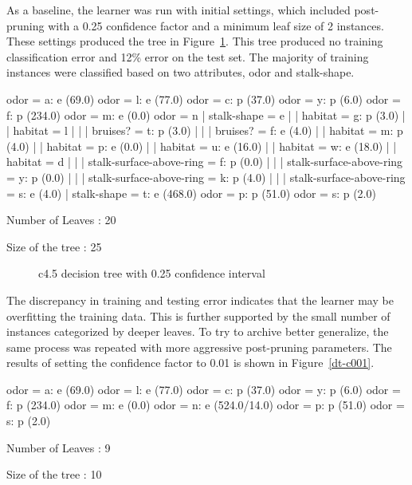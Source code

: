 \documentclass{sig-alternate}
\begin{document}
As a baseline, the learner was run with initial settings, which included post-pruning with a 0.25 confidence factor and a minimum leaf size of 2 instances. These settings produced the tree in Figure~\ref{dt-c025}. This tree produced no training classification error and 12\% error on the test set. The majority of training instances were classified based on two attributes, odor and stalk-shape.

\begin{verbbox}

odor = a: e (69.0)
odor = l: e (77.0)
odor = c: p (37.0)
odor = y: p (6.0)
odor = f: p (234.0)
odor = m: e (0.0)
odor = n
|   stalk-shape = e
|   |   habitat = g: p (3.0)
|   |   habitat = l
|   |   |   bruises? = t: p (3.0)
|   |   |   bruises? = f: e (4.0)
|   |   habitat = m: p (4.0)
|   |   habitat = p: e (0.0)
|   |   habitat = u: e (16.0)
|   |   habitat = w: e (18.0)
|   |   habitat = d
|   |   |   stalk-surface-above-ring = f: p (0.0)
|   |   |   stalk-surface-above-ring = y: p (0.0)
|   |   |   stalk-surface-above-ring = k: p (4.0)
|   |   |   stalk-surface-above-ring = s: e (4.0)
|   stalk-shape = t: e (468.0)
odor = p: p (51.0)
odor = s: p (2.0)

Number of Leaves  :     20

Size of the tree :  25

\end{verbbox}

\begin{figure}[!htbp]
    \centering
    \theverbbox
    \caption{c4.5 decision tree with 0.25 confidence interval \label{dt-c025}}
\end{figure}


The discrepancy in training and testing error indicates that the learner may be overfitting the training data. This is further supported by the small number of instances categorized by deeper leaves. To try to archive better generalize, the same process was repeated with more aggressive post-pruning parameters. The results of setting the confidence factor to 0.01 is shown in Figure~\ref{dt-c001}.

\begin{verbbox}

odor = a: e (69.0)
odor = l: e (77.0)
odor = c: p (37.0)
odor = y: p (6.0)
odor = f: p (234.0)
odor = m: e (0.0)
odor = n: e (524.0/14.0)
odor = p: p (51.0)
odor = s: p (2.0)

Number of Leaves  :     9

Size of the tree :  10

\end{verbbox}
\end{document}
